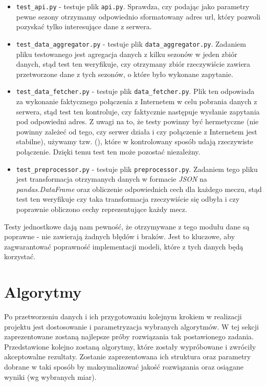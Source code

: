         \begin{itemize}
            \item \texttt{test\_api.py} - testuje plik \texttt{api.py}. Sprawdza, czy podając jako parametry pewne sezony otrzymamy odpowiednio sformatowany adres url, który pozwoli pozyskać tylko interesujące dane z serwera.
            \item \texttt{test\_data\_aggregator.py} - testuje plik \texttt{data\_aggregator.py}. Zadaniem pliku testowanego jest agregacja danych z kilku sezonów w jeden zbiór danych, stąd test ten weryfikuje, czy otrzymany zbiór rzeczywiście zawiera przetworzone dane z tych sezonów, o które było wykonane zapytanie.
            \item \texttt{test\_data\_fetcher.py} - testuje plik \texttt{data\_fetcher.py}. Plik ten odpowiada za wykonanie faktycznego połączenia z Internetem w celu pobrania danych z serwera, stąd test ten kontroluje, czy faktycznie następuje wysłanie zapytania pod odpowiedni adres. Z uwagi na to, że testy powinny być hermetyczne (nie powinny zależeć od tego, czy serwer działa i czy połączenie z Internetem jest stabilne), używamy tzw.  (), które w kontrolowany sposób udają rzeczywiste połączenie. Dzięki temu test ten może pozostać niezależny.
            \item \texttt{test\_preprocessor.py} - testuje plik \texttt{preprocessor.py}. Zadaniem tego pliku jest transformacja otrzymanych danych w formacie \emph{JSON} na \emph{pandas.DataFrame} oraz obliczenie odpowiednich cech dla każdego meczu, stąd test ten weryfikuje czy taka transformacja rzeczywiście się odbyła i czy poprawnie obliczono cechy reprezentujące każdy mecz.
        \end{itemize}
        
        Testy jednostkowe dają nam pewność, że otrzymywane z tego modułu dane są poprawne - nie zawierają żadnych błędów i braków. Jest to kluczowe, aby zagwarantować poprawność implementacji modeli, które z tych danych będą korzystać.
        
    \section{Algorytmy}
    \noindent Po przetworzeniu danych i ich przygotowaniu kolejnym krokiem w realizacji projektu jest dostosowanie i parametryzacja wybranych algorytmów. W tej sekcji zaprezentowane zostaną najlepsze próby rozwiązania tak postawionego zadania. Przedstawione kolejno zostaną algorytmy, które zostały wypróbowane i zwróciły akceptowalne rezultaty. Zostanie zaprezentowana ich struktura oraz parametry dobrane w taki sposób by maksymalizować jakość rozwiązania oraz osiągane wyniki (wg wybranych miar).
